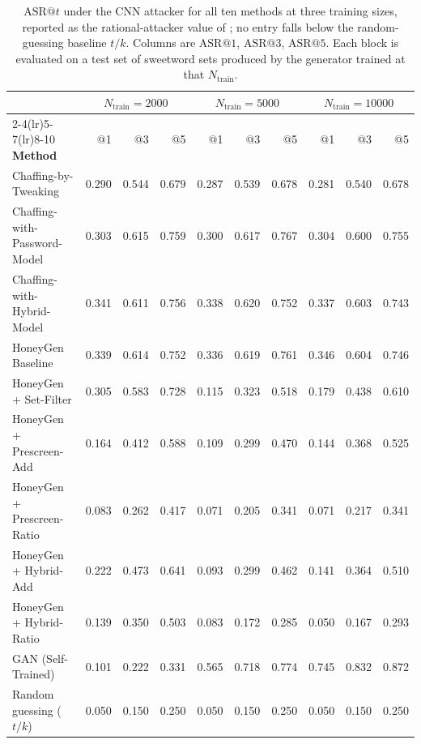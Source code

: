 \begin{table}[t]
  \centering\small
  \setlength{\tabcolsep}{4pt}
  \begin{tabular}{lrrrrrrrrr}
    \toprule
    & \multicolumn{3}{c}{$N_{\text{train}}{=}2000$}
    & \multicolumn{3}{c}{$N_{\text{train}}{=}5000$}
    & \multicolumn{3}{c}{$N_{\text{train}}{=}10000$} \\
    \cmidrule(lr){2-4}\cmidrule(lr){5-7}\cmidrule(lr){8-10}
    \textbf{Method} & @1 & @3 & @5 & @1 & @3 & @5 & @1 & @3 & @5 \\
    \midrule
    Chaffing-by-Tweaking & 0.290 & 0.544 & 0.679 & 0.287 & 0.539 & 0.678 & 0.281 & 0.540 & 0.678 \\
    Chaffing-with-Password-Model & 0.303 & 0.615 & 0.759 & 0.300 & 0.617 & 0.767 & 0.304 & 0.600 & 0.755 \\
    Chaffing-with-Hybrid-Model & 0.341 & 0.611 & 0.756 & 0.338 & 0.620 & 0.752 & 0.337 & 0.603 & 0.743 \\
    HoneyGen Baseline & 0.339 & 0.614 & 0.752 & 0.336 & 0.619 & 0.761 & 0.346 & 0.604 & 0.746 \\
    \addlinespace
    HoneyGen + Set-Filter & 0.305 & 0.583 & 0.728 & 0.115 & 0.323 & 0.518 & 0.179 & 0.438 & 0.610 \\
    HoneyGen + Prescreen-Add & 0.164 & 0.412 & 0.588 & 0.109 & 0.299 & 0.470 & 0.144 & 0.368 & 0.525 \\
    HoneyGen + Prescreen-Ratio & 0.083 & 0.262 & 0.417 & 0.071 & 0.205 & 0.341 & 0.071 & 0.217 & 0.341 \\
    HoneyGen + Hybrid-Add & 0.222 & 0.473 & 0.641 & 0.093 & 0.299 & 0.462 & 0.141 & 0.364 & 0.510 \\
    HoneyGen + Hybrid-Ratio & 0.139 & 0.350 & 0.503 & 0.083 & 0.172 & 0.285 & 0.050 & 0.167 & 0.293 \\
        GAN (Self-Trained) & 0.101 & 0.222 & 0.331 & 0.565 & 0.718 & 0.774 & 0.745 & 0.832 & 0.872 \\
    \addlinespace
    Random guessing ($t/k$) & 0.050 & 0.150 & 0.250 & 0.050 & 0.150 & 0.250 & 0.050 & 0.150 & 0.250 \\
    \bottomrule
  \end{tabular}
  \caption{$\mathrm{ASR}@t$ under the CNN attacker for all ten methods at
    three training sizes, reported as the rational-attacker value of
  ; no entry falls below the random-guessing baseline
  $t/k$.
  Columns are $\mathrm{ASR}@1$, $\mathrm{ASR}@3$, $\mathrm{ASR}@5$.
  Each block is evaluated on a test set of sweetword sets produced by
  the generator trained at that $N_{\text{train}}$.}
  \label{tab:asr-master}
\end{table}
